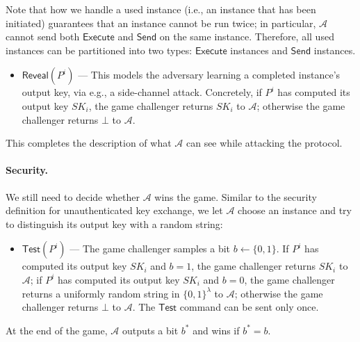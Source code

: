 \documentclass{article}
\newcommand{\adv}{\mathcal{A}}
\newcommand{\Execute}{\mathsf{Execute}}
\newcommand{\Send}{\mathsf{Send}}
\newcommand{\Reveal}{\mathsf{Reveal}}
\newcommand{\Test}{\mathsf{Test}}
\begin{document}
Note that how we handle a used instance (i.e., an instance that has been initiated) guarantees that an instance cannot be run twice; in particular, $\adv$ cannot send both $\Execute$ and $\Send$ on the same instance. Therefore, all used instances can be partitioned into two types: $\Execute$ instances and $\Send$ instances.
\begin{itemize}
  \item $\Reveal(P^i)$ --- This models the adversary learning a completed instance's output key, via e.g., a side-channel attack. Concretely, if $P^i$ has computed its output key $SK_i$, the game challenger returns $SK_i$ to $\adv$; otherwise the game challenger returns $\bot$ to $\adv$.
\end{itemize}

This completes the description of what $\adv$ can see while attacking the protocol.
\paragraph{Security.}
We still need to decide whether $\adv$ wins the game. Similar to the security definition for unauthenticated key exchange, we let $\adv$ choose an instance and try to distinguish its output key with a random string:
\begin{itemize}
  \item $\Test(P^i)$ --- The game challenger samples a bit $b \gets \{0,1\}$. If $P^i$ has computed its output key $SK_i$ and $b = 1$, the game challenger returns $SK_i$ to $\adv$; if $P^i$ has computed its output key $SK_i$ and $b = 0$, the game challenger returns a uniformly random string in $\{0,1\}^\lambda$ to $\adv$; otherwise the game challenger returns $\bot$ to $\adv$. The $\Test$ command can be sent only once.
\end{itemize}
At the end of the game, $\adv$ outputs a bit $b^*$ and wins if $b^* = b$.
\end{document}
